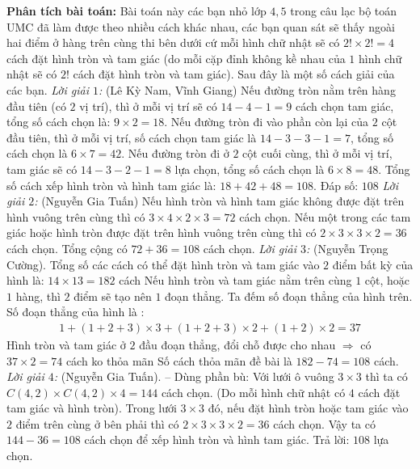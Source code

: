 \begin{multicols}{2}
\begin{multicols}{2}
\begin{figure}[H]
			\vspace*{-5pt}
		\end{figure}
	\end{multicols}
	\textbf{Phân tích bài toán:} Bài toán này các bạn nhỏ lớp $4,5$ trong câu lạc bộ toán UMC đã làm được theo nhiều cách khác nhau, các bạn quan sát sẽ thấy ngoài hai điểm ở hàng trên cùng thi bên dưới cứ mỗi hình chữ nhật sẽ có $2!\times 2!=4$ cách đặt hình tròn và tam giác (do mỗi cặp đỉnh không kề nhau của $1$ hình chữ nhật sẽ có $2!$ cách đặt hình tròn và tam giác). Sau đây là một số cách giải của các bạn.
	\vskip 0.1cm
	\textit{Lời giải $1$: }(Lê Kỳ Nam, Vĩnh Giang)
	\vskip 0.1cm
	Nếu đường tròn nằm trên hàng đầu tiên (có $2$ vị trí), thì ở mỗi vị trí sẽ có $14 - 4 - 1 = 9$ cách chọn tam giác, tổng số cách chọn là: $9 \times 2 = 18$.
	\vskip 0.1cm
	Nếu đường tròn đi vào phần còn lại của $2$ cột đầu tiên, thì ở mỗi vị trí, số cách chọn tam giác là $14 - 3 - 3 - 1 = 7$, tổng số cách chọn là $6 \times 7 = 42$.
	\vskip 0.1cm
	Nếu đường tròn đi ở $2$ cột cuối cùng, thì ở mỗi vị trí, tam giác sẽ có $14 - 3 - 2 - 1 = 8$ lựa chọn, tổng số cách chọn là $6 \times 8 = 48$.
	\vskip 0.1cm
	Tổng số cách xếp hình tròn và hình tam giác là: $18 + 42 + 48 = 108$.
	\vskip 0.1cm
	Đáp số: $108$
	\vskip 0.1cm
	\textit{Lời giải $2$:} (Nguyễn Gia Tuấn)
	\vskip 0.1cm
	Nếu hình tròn và hình tam giác không được đặt trên hình vuông trên cùng thì có $3 \times 4 \times 2 \times 3 = 72$ cách chọn.
	\vskip 0.1cm
	Nếu một trong các tam giác hoặc hình tròn được đặt trên hình vuông trên cùng thì có $2 \times 3 \times 3 \times 2 = 36$ cách chọn.
	\vskip 0.1cm
	Tổng cộng có $72 + 36 = 108$ cách chọn.
	\vskip 0.1cm
	\textit{Lời giải $3$:} (Nguyễn Trọng Cường).
	\vskip 0.1cm
	Tổng số các cách có thể đặt hình tròn và tam giác vào $2$ điểm bất kỳ của hình là: $14\times13 = 182$ cách
	\vskip 0.1cm
	Nếu hình tròn và tam giác nằm trên cùng $1$ cột, hoặc $1$ hàng, thì $2$ điểm sẽ tạo nên $1$ đoạn thẳng. Ta đếm số đoạn thẳng của hình trên.
	\vskip 0.1cm
	Số đoạn thẳng của hình là :
	\begin{align*}
		1 + (1+2+3) \times 3 + (1+2+3) \times 2 + (1+2) \times 2 = 37
	\end{align*}
	Hình tròn và tam giác ở $2$ đầu đoạn thẳng, đổi chỗ được cho nhau $\Rightarrow$ có $37 \times 2 = 74$ cách ko thỏa mãn
	\vskip 0.1cm
	Số cách thỏa mãn đề bài là $182 - 74 = 108$ cách.
	\vskip 0.1cm
	\textit{Lời giải $4$:} (Nguyễn Gia Tuấn). -- Dùng phần bù:
	\vskip 0.1cm
	Với lưới ô vuông $3 \times 3$ thì ta có $C(4,2)\times C(4,2)\times 4 = 144$ cách chọn. (Do mỗi hình chữ nhật có $4$ cách đặt tam giác và hình tròn).
	\vskip 0.1cm
	Trong lưới $3 \times 3$ đó, nếu đặt hình tròn hoặc tam giác vào $2$ điểm trên cùng ở bên phải thì có $2 \times 3 \times  3 \times 2 = 36$ cách chọn.
	\vskip 0.1cm
	Vậy ta có $144 - 36 = 108$ cách chọn để xếp hình tròn và hình tam giác.
	\vskip 0.1cm
	Trả lời: $108$ lựa chọn.
\end{multicols}


